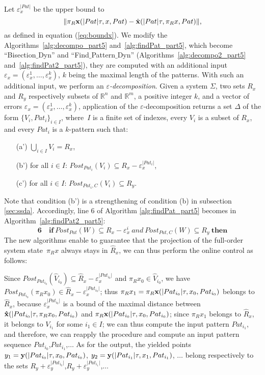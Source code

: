 Let $\varepsilon_x^{\vert Pat \vert}$ be the upper bound to
 \[ \Vert \pi_R {\bf x}(\vert Pat \vert \tau,x,Pat) - {\hat {\bf x}}(\vert Pat \vert \tau,\pi_R x,Pat) \Vert, \]
as defined in equation (\ref{eq:boundx}).
We modify the Algorithms~\ref{alg:decompo_part5} and~\ref{alg:findPat_part5}, which
become ``Bisection$\_$\-Dyn'' and 
``Find$\_$Patt\-ern$\_$\-Dyn'' (Algorithms~\ref{alg:decompo2_part5} and~\ref{alg:findPat2_part5}),
they are computed with an additional input $\varepsilon_x = (\varepsilon_x^1,\dots,
\varepsilon_x^k)$, $k$ being the
maximal length of the patterns. With such an additional input, we perform
an {\em $\varepsilon$-decomposition}.
Given a system $\Sigma$, two sets $R_x$  and $R_y$ respectively subsets of ${\mathbb{R}^n}$
and  ${\mathbb{R}^m}$, a positive integer $k$, and a vector of errors $\varepsilon_x = (\varepsilon_x^1,\dots,
 \varepsilon_x^k)$,
application of the $\varepsilon$-decomposition
returns a set $\Delta$
of the form $\{V_i,Pat_i\}_{i \in I}$, where~$I$ is a finite set of indexes, every $V_i$ is a subset of $R_x$, and every $Pat_i$ is a $k$-pattern such that:
\begin{itemize} 
\item[(a')] $\bigcup_{i \in I}V_i = R_x$, 
\item[(b')] for all $i \in I$: $Post_{Pat_i}(V_i) \subseteq R_x - \varepsilon_x^{\vert Pat_i \vert}$,
\item[(c')] for all $i \in I$: $Post_{Pat_i,C}(V_i) \subseteq R_y$.
\end{itemize}


Note that condition (b') is a strengthening of condition (b) in subsection \ref{sec:ssda}.
Accordingly, line 6 of Algorithm \ref{alg:findPat_part5} becomes in Algorithm~\ref{alg:findPat2_part5}:
{
\[
\textbf{6} \quad \textbf{if} ~{Post_{Pat}(W) \subseteq R_x - \varepsilon_x^i ~and ~Post_{Pat,C}(W) \subseteq R_y } ~\textbf{then}
\]
}
The new algorithms enable to guarantee that the projection of the full-order system state~$\pi_R x$
always stays in $\hat R_x$, we can thus perform the online control as follows:

Since $Post_{Pat_{i_0}}(\hat V_{i_0}) \subseteq \hat R_x - \varepsilon_x^{\vert Pat_{i_0} \vert}$
and $\pi_R x_0 \in \hat V_{i_0}$,
we have $Post_{Pat_{i_0}}(\pi_R x_0) \in \hat R_x - \varepsilon_x^{\vert Pat_{i_0} \vert}$;
thus  $\pi_R x_1 = \pi_R {\bf x}(\vert Pat_{i_0} \vert \tau,x_0,Pat_{i_0})$ belongs to $\hat R_x$, because $\varepsilon_x^{\vert Pat_{i_0} \vert}$
is a bound of the maximal distance between ${\bf \hat x}(\vert Pat_{i_0} \vert \tau,\pi_R x_0,Pat_{i_0})$
and $\pi_R {\bf x}(\vert Pat_{i_0} \vert \tau,x_0,Pat_{i_0})$; \linebreak
 since $\pi_R x_1$ belongs to $\hat R_x$, it belongs to $V_{i_1}$ for some $i_1 \in I$; we can thus compute the input pattern $Pat_{i_1}$,
and therefore, we can reapply the procedure and compute an input pattern sequence $Pat_{i_0}$,$Pat_{i_1}$,$\dots$
As for the output, the yielded points $y_1 = {\bf y} (\vert Pat_{i_0} \vert \tau, x_0, Pat_{i_0})$, 
$y_2 = {\bf y} (\vert Pat_{i_1} \vert \tau, x_1, Pat_{i_1})$, $\dots$ belong respectively 
to the sets $R_y + \varepsilon_y^{\vert Pat_{i_0} \vert}$,$R_y + \varepsilon_y^{\vert Pat_{i_1} \vert}$,$\dots$



